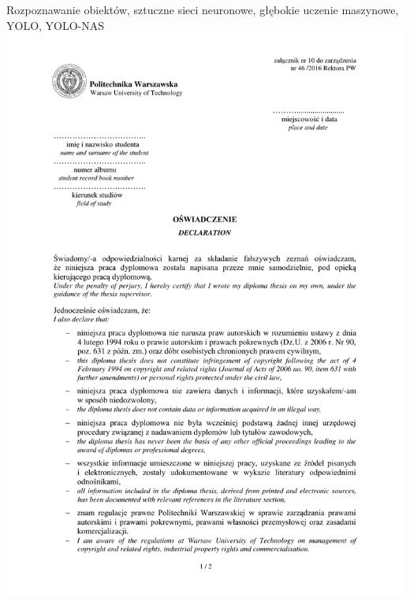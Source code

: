 \documentclass[
    bindingoffset=5mm,  %
    footnoteindent=3mm, %
    hyphenation=true    %
]{src/wut-thesis}
\begin{document}
\clearpage
\secondabstract 
\secondkeywords Rozpoznawanie obiektów, sztuczne sieci neuronowe, 
głębokie uczenie maszynowe, YOLO, YOLO-NAS
\clearpage
\includegraphics[width=\textwidth]{src/en/authorship/eiti-1.pdf}
\clearpage
\end{document}
